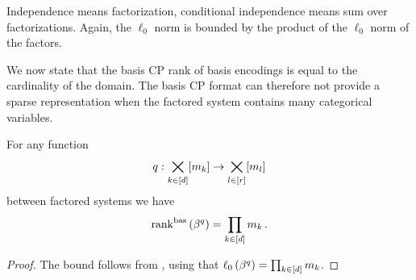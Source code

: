 \begin{example}
    Independence means factorization, conditional independence means sum over factorizations.
    Again, the $\ell_0$ norm is bounded by the product of the $\ell_0$ norm of the factors.
\end{example}






We now state that the basis CP rank of basis encodings is equal to the cardinality of the domain.
The basis CP format can therefore not provide a sparse representation when the factored system contains many categorical variables.


\begin{theorem}
    \label{the:bencodingBasCP}
    For any function
    \[ q : \bigtimes_{k\in[d]}[m_{k}] \rightarrow  \bigtimes_{l\in[r]}[m_{l}] \]
    between factored systems we have
    \[ \mathrm{rank}^{\mathrm{bas}}\left(\beta^{q}\right) =  \prod_{k\in[d]}m_{k} \, . \]
\end{theorem}
\begin{proof}
    The bound follows from , using that $\ell_0\left(\beta^{q}\right)=\prod_{k\in[d]}m_{k}$.
\end{proof}

